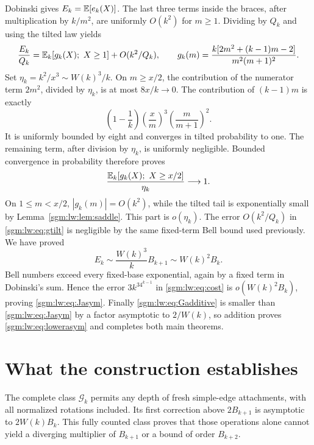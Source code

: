 \documentclass[11pt,letterpaper]{article}
\theoremstyle{remark}\newtheorem{remark}[theorem]{Remark}
\newcommand{\Gc}{\mathcal G}\newcommand{\Hc}{\mathcal H}\newcommand{\Jc}{\mathcal J}
\theoremstyle{definition}\newtheorem{definition}[theorem]{Definition}
\begin{document}
Dobinski gives $E_k=\mathbb E[e_k(X)]$. The last three terms inside the braces, after multiplication by $k/m^2$, are uniformly $O(k^2)$ for $m\ge1$. Dividing by $Q_k$ and using the tilted law yields
\begin{equation}\label{sgm:lw:eq:gtilt}
 \frac{E_k}{Q_k}=\mathbb E_k[g_k(X);\ X\ge1]+O(k^2/Q_k),\qquad
 g_k(m)=\frac{k[2m^2+(k-1)m-2]}{m^2(m+1)^2}.
\end{equation}
Set $\eta_k=k^2/x^3\sim W(k)^3/k$. On $m\ge x/2$, the contribution of the numerator term $2m^2$, divided by $\eta_k$, is at most $8x/k\to0$. The contribution of $(k-1)m$ is exactly
\[
 \left(1-\frac1k\right)\left(\frac{x}{m}\right)^3
                           \left(\frac{m}{m+1}\right)^2.
\]
It is uniformly bounded by eight and converges in tilted probability to one. The remaining term, after division by $\eta_k$, is uniformly negligible. Bounded convergence in probability therefore proves
\[
 \frac{\mathbb E_k[g_k(X);\ X\ge x/2]}{\eta_k}\longrightarrow1.
\]
On $1\le m<x/2$, $|g_k(m)|=O(k^2)$, while the tilted tail is exponentially small by Lemma~\ref{sgm:lw:lem:saddle}. This part is $o(\eta_k)$. The error $O(k^2/Q_k)$ in \eqref{sgm:lw:eq:gtilt} is negligible by the same fixed-term Bell bound used previously. We have proved
\begin{equation}\label{sgm:lw:eq:Easym}
 E_k\sim\frac{W(k)^3}{k}B_{k+1}\sim W(k)^2B_k.
\end{equation}
Bell numbers exceed every fixed-base exponential, again by a fixed term in Dobinski's sum. Hence the error $3k^34^{k-1}$ in \eqref{sgm:lw:eq:cost} is $o(W(k)^2B_k)$, proving \eqref{sgm:lw:eq:Jasym}. Finally \eqref{sgm:lw:eq:Gadditive} is smaller than \eqref{sgm:lw:eq:Jasym} by a factor asymptotic to $2/W(k)$, so addition proves \eqref{sgm:lw:eq:lowerasym} and completes both main theorems.

\section{What the construction establishes}\label{sgm:lw:sec:what}%
The complete class $\Gc_k$ permits any depth of fresh simple-edge attachments, with all normalized rotations included. Its first correction above $2B_{k+1}$ is asymptotic to $2W(k)B_k$. This fully counted class proves that those operations alone cannot yield a diverging multiplier of $B_{k+1}$ or a bound of order $B_{k+2}$.
\end{document}
